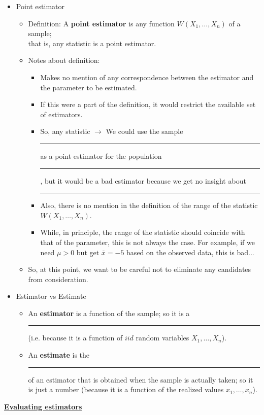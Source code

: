 \documentclass{article}
\newcommand{\bu}[1]{\textbf{\ul{#1}}}				%
\newcommand{\blankul}[1]{\rule[-1.5mm]{#1}{0.15mm}}	%
\newcommand{\vecn}[2]{#1_1, \ldots, #1_{#2}}	%
\begin{document}
\begin{itemize}
    \item Point estimator
    \begin{itemize}
        \item Definition: A \textbf{point estimator} is any function $W(\vecn{X}{n})$ of a sample;\\ that is, any statistic is a point estimator.\bigskip
        \item Notes about definition:
        \begin{itemize}
            \item Makes no mention of any correspondence between the estimator and the parameter to be estimated.
            \item[] If this were a part of the definition, it would restrict the available set of estimators.
            \item[] So, any statistic $\rightarrow$ We could use the sample \blankul{2.5cm} as a point estimator for the population \blankul{2cm}, but it would be a bad estimator because we get no insight about \blankul{2cm}
            \item Also, there is no mention in the definition of the range of the statistic $W(\vecn{X}{n})$.
            \item[] While, in principle, the range of the statistic should coincide with that of the parameter, this is not always the case. For example, if we need $\mu > 0$ but get $\bar{x} = - 5$ based on the observed data, this is bad...
        \end{itemize}
        \item So, at this point, we want to be careful not to eliminate any candidates from consideration.
    \end{itemize}\bigskip
    \item Estimator vs Estimate
    \begin{itemize}
        \item An \textbf{estimator} is a function of the sample; so it is a \blankul{4cm} (i.e. because it is a function of $iid$ random variables $\vecn{X}{n}$).
        \item An \textbf{estimate} is the \blankul{4cm} of an estimator that is obtained when the sample is actually taken; so it is just a number (because it is a function of the realized values $\vecn{x}{n}$).
    \end{itemize}
\end{itemize}

\newpage

\bu{Evaluating estimators}\bigskip
\end{document}
